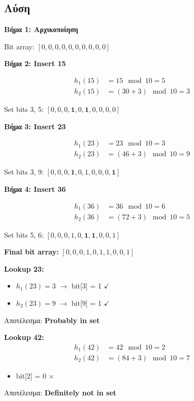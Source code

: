 \subsection*{Λύση}

\textbf{Βήμα 1: Αρχικοποίηση}

Bit array: $[0, 0, 0, 0, 0, 0, 0, 0, 0, 0]$

\textbf{Βήμα 2: Insert 15}

\begin{align*}
h_1(15) &= 15 \mod 10 = 5 \\
h_2(15) &= (30 + 3) \mod 10 = 3
\end{align*}

Set bits 3, 5: $[0, 0, 0, \mathbf{1}, 0, \mathbf{1}, 0, 0, 0, 0]$

\textbf{Βήμα 3: Insert 23}

\begin{align*}
h_1(23) &= 23 \mod 10 = 3 \\
h_2(23) &= (46 + 3) \mod 10 = 9
\end{align*}

Set bits 3, 9: $[0, 0, 0, \mathbf{1}, 0, 1, 0, 0, 0, \mathbf{1}]$

\textbf{Βήμα 4: Insert 36}

\begin{align*}
h_1(36) &= 36 \mod 10 = 6 \\
h_2(36) &= (72 + 3) \mod 10 = 5
\end{align*}

Set bits 5, 6: $[0, 0, 0, 1, 0, \mathbf{1}, \mathbf{1}, 0, 0, 1]$

\textbf{Final bit array:} $[0, 0, 0, 1, 0, 1, 1, 0, 0, 1]$

\textbf{Lookup 23:}
\begin{itemize}
    \item $h_1(23) = 3$ $\to$ bit[3] = 1 $\checkmark$
    \item $h_2(23) = 9$ $\to$ bit[9] = 1 $\checkmark$
\end{itemize}
Αποτέλεσμα: \textbf{Probably in set}

\textbf{Lookup 42:}
\begin{align*}
h_1(42) &= 42 \mod 10 = 2 \\
h_2(42) &= (84 + 3) \mod 10 = 7
\end{align*}
\begin{itemize}
    \item bit[2] = 0 $\times$
\end{itemize}
Αποτέλεσμα: \textbf{Definitely not in set}

